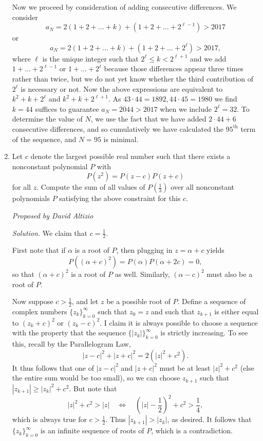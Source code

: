 \documentclass[10pt]{article}
\newcommand{\proposed}[1]
{
\vspace{5pt}
\noindent\textit{Proposed by #1}
}
\newcommand{\solution}
{
\vspace{5pt}
\noindent\textit{Solution.}\qquad
}
\begin{document}
\begin{enumerate}
	Now we proceed by consideration of adding consecutive differences. We consider 
	\[
		a_{N} = 2(1 + 2 + \ldots + k) + (1 + 2 + \ldots + 2^{\ell-1}) > 2017
	\]
	or
	\[
		a_{N} = 2(1 + 2 + \ldots + k) + (1 + 2 + \ldots + 2^{\ell}) > 2017,
	\]
	where $\ell$ is the unique integer such that $2^{\ell} \leq k < 2^{\ell+1}$ and we add $1 + \ldots + 2^{\ell-1}$ or $1 + \ldots + 2^{\ell}$ because those differences appear three times rather than twice, but we do not yet know whether the third contribution of $2^{\ell}$ is necessary or not. Now the above expressions are equivalent to $k^{2} + k + 2^{\ell}$ and $k^{2} + k + 2^{\ell + 1}$. As $43 \cdot 44 = 1892, 44\cdot 45 = 1980$ we find $k = 44$ suffices to guarantee $a_{N} = 2044 > 2017$ when we include $2^{\ell} = 32$. To determine the value of $N$, we use the fact that we have added $2 \cdot 44 + 6$ consecutive differences, and so cumulatively we have calculated the $95^{\text{th}}$ term of the sequence, and $N = \boxed{95}$ is minimal.\\



\item Let $c$ denote the largest possible real number such that there exists a nonconstant polynomial $P$ with \[P(z^2)=P(z-c)P(z+c)\] for all $z$.  Compute the sum of all values of $P(\tfrac13)$ over all nonconstant polynomials $P$ satisfying the above constraint for this $c$.

\proposed{David Altizio}

\solution We claim that $c=\tfrac12$.

\par First note that if $\alpha$ is a root of $P$, then plugging in $z=\alpha+c$ yields \[P((\alpha+c)^2) = P(\alpha)P(\alpha+2c) = 0,\] so that $(\alpha+c)^2$ is a root of $P$ as well.  Similarly, $(\alpha-c)^2$ must also be a root of $P$.

Now suppose $c > \frac12$, and let $z$ be a possible root of $P$.  Define a sequence of complex numbers $\{z_k\}_{k=0}^\infty$ such that $z_0=z$ and such that $z_{k+1}$ is either equal to $(z_k+c)^2$ or $(z_k-c)^2$.  I claim it is always possible to choose a sequence with the property that the sequence $\{|z_k|\}_{k=0}^\infty$ is strictly increasing.  To see this, recall by the Parallelogram Law, \[|z-c|^2+|z+c|^2 = 2(|z|^2+c^2).\] It thus follows that one of $|z-c|^2$ and $|z+c|^2$ must be at least $|z|^2+c^2$ (else the entire sum would be too small), so we can choose $z_{k+1}$ such that $|z_{k+1}|\geq |z_k|^2+c^2$.  But note that \[|z|^2+c^2>|z|\quad\iff\quad \left(|z|-\frac12\right)^2 + c^2 > \frac14,\] which is always true for $c>\tfrac12$.  Thus $|z_{k+1}| > |z_k|$, as desired.  It follows that $\{z_k\}_{k=0}^\infty$ is an infinite sequence of roots of $P$, which is a contradiction.


\end{enumerate}
\end{document}
